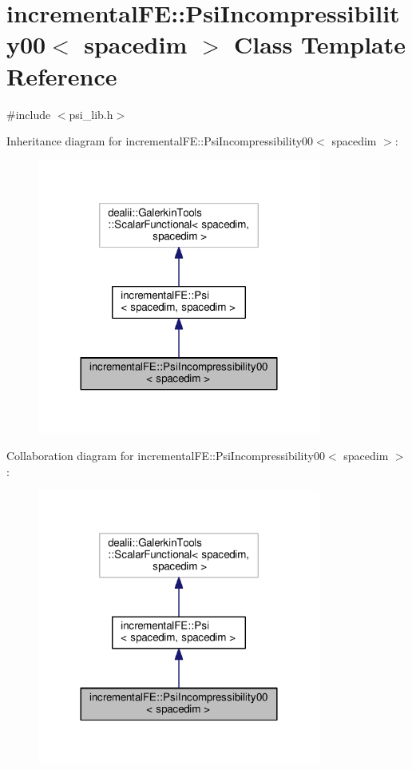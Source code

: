 \hypertarget{classincremental_f_e_1_1_psi_incompressibility00}{}\section{incremental\+FE\+:\+:Psi\+Incompressibility00$<$ spacedim $>$ Class Template Reference}
\label{classincremental_f_e_1_1_psi_incompressibility00}


{\ttfamily \#include $<$psi\+\_\+lib.\+h$>$}



Inheritance diagram for incremental\+FE\+:\+:Psi\+Incompressibility00$<$ spacedim $>$\+:\nopagebreak
\begin{figure}[H]
\begin{center}
\leavevmode
\includegraphics[width=264pt]{classincremental_f_e_1_1_psi_incompressibility00__inherit__graph}
\end{center}
\end{figure}


Collaboration diagram for incremental\+FE\+:\+:Psi\+Incompressibility00$<$ spacedim $>$\+:\nopagebreak
\begin{figure}[H]
\begin{center}
\leavevmode
\includegraphics[width=264pt]{classincremental_f_e_1_1_psi_incompressibility00__coll__graph}
\end{center}
\end{figure}
